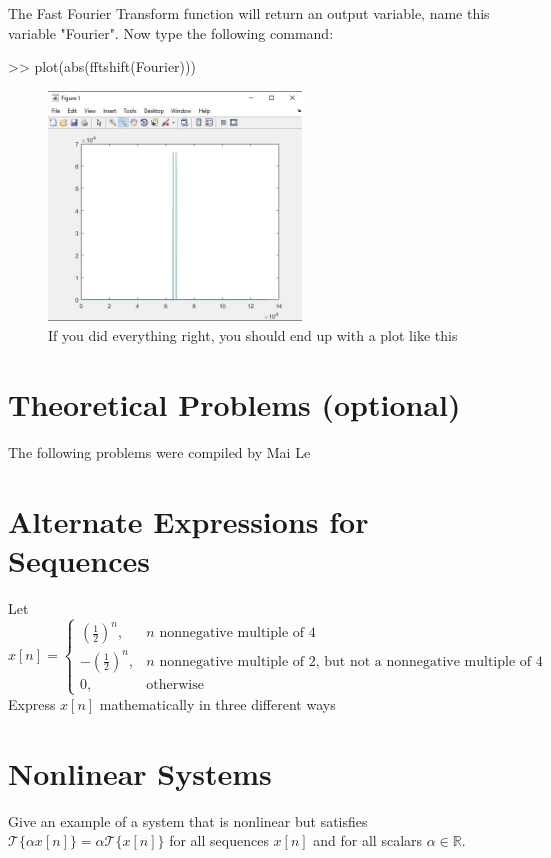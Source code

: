 \documentclass[11pt]{article}
\begin{document}
\vspace{3mm}

The Fast Fourier Transform function will return an output variable, name this variable "Fourier".\newline
Now type the following command:

\begin{center}

>> plot(abs(fftshift(Fourier)))

\end{center}

\vspace{80mm}
\begin{figure}[h]

\centering
\includegraphics[width=0.6\textwidth]{cosineFFTplot}
\caption {If you did everything right, you should end up with a plot like this}
\end{figure}

\section*{Theoretical Problems (optional)}
The following problems were compiled by Mai Le

\section{Alternate Expressions for Sequences}
Let $x[n] = \begin{cases} \left(\frac{1}{2}\right)^n, & n \text{ nonnegative multiple of 4} \\ -\left(\frac{1}{2}\right)^n, & n \text{ nonnegative multiple of 2, but not a nonnegative multiple of 4} \\ 0, & \text{otherwise}\end{cases}$ \\
Express $x[n]$ mathematically in three different ways

\section{Nonlinear Systems}
Give an example of a system that is nonlinear but satisfies $\mathcal{T}\{\alpha x[n]\} = \alpha \mathcal{T}\{x[n]\}$ for all sequences $x[n]$ and for all scalars $\alpha \in \mathbb{R}$.
\end{document}
